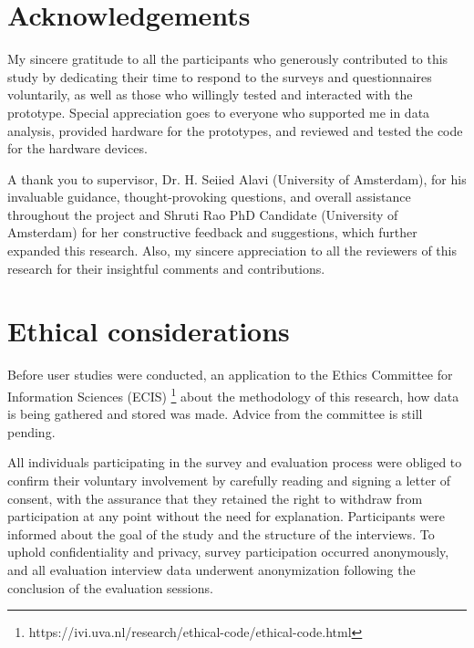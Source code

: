 \onecolumn

\appendix
\begin{appendices}

\section{Acknowledgements}
\label{appendix:acknowledgements}

My sincere gratitude to all the participants who generously contributed to this study by dedicating their time to respond to the surveys and questionnaires voluntarily, as well as those who willingly tested and interacted with the prototype. Special appreciation goes to everyone who supported me in data analysis, provided hardware for the prototypes, and reviewed and tested the code for the hardware devices.

A thank you to supervisor, Dr. H. Seiied Alavi (University of Amsterdam), for his invaluable guidance, thought-provoking questions, and overall assistance throughout the project and Shruti Rao PhD Candidate (University of Amsterdam) for her constructive feedback and suggestions, which further expanded this research. Also, my sincere appreciation to all the reviewers of this research for their insightful comments and contributions.

\section{Ethical considerations}
\label{appendix:ethical}

Before user studies were conducted, an application to the Ethics Committee for Information Sciences (ECIS) \footnote{https://ivi.uva.nl/research/ethical-code/ethical-code.html} about the methodology of this research, how data is being gathered and stored was made. Advice from the committee is still pending.

All individuals participating in the survey and evaluation process were obliged to confirm their voluntary involvement by carefully reading and signing a letter of consent, with the assurance that they retained the right to withdraw from participation at any point without the need for explanation. Participants were informed about the goal of the study and the structure of the interviews. To uphold confidentiality and privacy, survey participation occurred anonymously, and all evaluation interview data underwent anonymization following the conclusion of the evaluation sessions.


\end{appendices}
